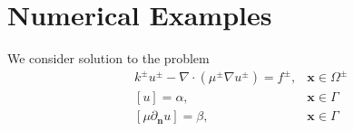 \documentclass{elsarticle}
\begin{document}
\section{Numerical Examples}

We consider solution to the problem
\begin{align*}
	 & k^{\pm}u^{\pm} - \nabla \cdot (\mu^{\pm}\nabla u^\pm)=f^{\pm}, & \mathbf{x}\in\Omega^\pm \\
	 & [u]=\alpha,                                                    & \mathbf{x} \in \Gamma   \\
	 & [\mu \partial_{\mathbf{n}}u]=\beta,                            & \mathbf{x} \in \Gamma
\end{align*}




%



\end{document}
